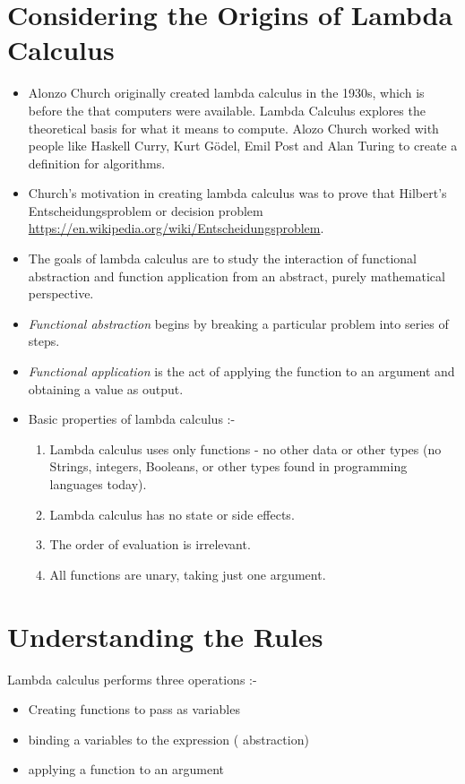 \section{Considering the Origins of Lambda Calculus}
\begin{itemize}
\item Alonzo Church originally created lambda calculus in the 1930s, which is before the that computers were available. Lambda Calculus explores the theoretical basis for what it means to compute. Alozo Church worked with people like Haskell Curry, Kurt Gödel, Emil Post and Alan Turing to create a definition for algorithms.
\item Church's motivation in creating lambda calculus was to prove that Hilbert's Entscheidungsproblem  or decision problem \textcolor{purple}{\url{https://en.wikipedia.org/wiki/Entscheidungsproblem}}. 
\item The goals of lambda calculus are to study the interaction of functional abstraction and function application from an abstract, purely mathematical perspective.
\item \emph{Functional abstraction} begins by breaking a particular problem into series of steps.
\item \emph{Functional application} is the act of applying the function to an argument and obtaining a value as output.
\item Basic properties of lambda calculus :-
\begin{enumerate}
\item Lambda calculus uses only functions - no other data or other types (no Strings, integers, Booleans, or other types found in programming languages today). 
\item Lambda calculus has no state or side effects.
\item The order of evaluation is irrelevant.
\item All functions are unary, taking just one argument.
\end{enumerate}
\end{itemize}

\section{Understanding the Rules}
Lambda calculus performs three operations :-
\begin{itemize}
\item Creating functions to pass as variables 
\item binding a variables to the expression ( abstraction)
\item applying a function to an argument
\end{itemize}
